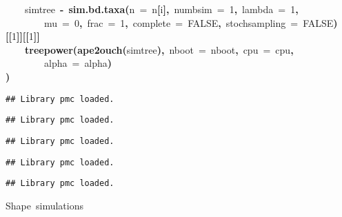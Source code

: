 \documentclass{elsarticle}
\makeatletter
\newcommand{\hlnumber}[1]{\textcolor[rgb]{0,0,0}{#1}}%
\newcommand{\hlfunctioncall}[1]{\textcolor[rgb]{.5,0,.33}{\textbf{#1}}}%
\newcommand{\hlkeyword}[1]{\textbf{#1}}%
\newcommand{\hlargument}[1]{\textcolor[rgb]{.69,.25,.02}{#1}}%
\newcommand{\hlcomment}[1]{\textcolor[rgb]{.18,.6,.34}{#1}}%
\newcommand{\hlassignement}[1]{\textbf{#1}}%
\newcommand{\hlsymbol}[1]{#1}%
\newcommand{\hlstd}[1]{\textcolor[rgb]{0,0,0}{#1}}%
\newenvironment{kframe}{%
 \def\FrameCommand##1{\hskip\@totalleftmargin \hskip-\fboxsep
 \colorbox{shadecolor}{##1}\hskip-\fboxsep
     \hskip-\linewidth \hskip-\@totalleftmargin \hskip\columnwidth}%
 \MakeFramed {\advance\hsize-\width
   \@totalleftmargin\z@ \linewidth\hsize
   \@setminipage}}%
 {\par\unskip\endMakeFramed}
\newenvironment{knitrout}{}{} %
\makeatother
\begin{document}
\begin{knitrout}
{\begin{kframe}
\begin{flushleft}
\hlstd{}{\ }{\ }{\ }{\ }\hlsymbol{simtree}{\ }\hlassignement{\usebox{\hlnormalsizeboxlessthan}-}{\ }\hlfunctioncall{sim.bd.taxa}\hlkeyword{(}\hlargument{n}{\ }\hlargument{=}{\ }\hlsymbol{n}\hlkeyword{[}\hlsymbol{i}\hlkeyword{]}\hlkeyword{,}{\ }\hlargument{numbsim}{\ }\hlargument{=}{\ }\hlnumber{1}\hlkeyword{,}{\ }\hlargument{lambda}{\ }\hlargument{=}{\ }\hlnumber{1}\hlkeyword{,}\hspace*{\fill}\\
\hlstd{}{\ }{\ }{\ }{\ }{\ }{\ }{\ }{\ }\hlargument{mu}{\ }\hlargument{=}{\ }\hlnumber{0}\hlkeyword{,}{\ }\hlargument{frac}{\ }\hlargument{=}{\ }\hlnumber{1}\hlkeyword{,}{\ }\hlargument{complete}{\ }\hlargument{=}{\ }\hlnumber{FALSE}\hlkeyword{,}{\ }\hlargument{stochsampling}{\ }\hlargument{=}{\ }\hlnumber{FALSE}\hlkeyword{)}\hlkeyword{[[}\hlnumber{1}\hlkeyword{]}\hlkeyword{]}\hlkeyword{[[}\hlnumber{1}\hlkeyword{]}\hlkeyword{]}\hspace*{\fill}\\
\hlstd{}{\ }{\ }{\ }{\ }\hlfunctioncall{treepower}\hlkeyword{(}\hlfunctioncall{ape2ouch}\hlkeyword{(}\hlsymbol{simtree}\hlkeyword{)}\hlkeyword{,}{\ }\hlargument{nboot}{\ }\hlargument{=}{\ }\hlsymbol{nboot}\hlkeyword{,}{\ }\hlargument{cpu}{\ }\hlargument{=}{\ }\hlsymbol{cpu}\hlkeyword{,}\hspace*{\fill}\\
\hlstd{}{\ }{\ }{\ }{\ }{\ }{\ }{\ }{\ }\hlargument{alpha}{\ }\hlargument{=}{\ }\hlsymbol{alpha}\hlkeyword{)}\hspace*{\fill}\\
\hlstd{}\hlkeyword{\usebox{\hlnormalsizeboxclosebrace}}\hlkeyword{)}\mbox{}
\normalfont
\end{flushleft}
\begin{verbatim}
## Library pmc loaded.
\end{verbatim}
\begin{verbatim}
## Library pmc loaded.
\end{verbatim}
\begin{verbatim}
## Library pmc loaded.
\end{verbatim}
\begin{verbatim}
## Library pmc loaded.
\end{verbatim}
\begin{verbatim}
## Library pmc loaded.
\end{verbatim}
\begin{flushleft}
\ttfamily\noindent
\hlcomment{\usebox{\hlnormalsizeboxhash}\usebox{\hlnormalsizeboxhash}{\ }Shape{\ }simulations}\hspace*{\fill}\\

\end{flushleft}
\end{kframe}}
\end{knitrout}
\end{document}
